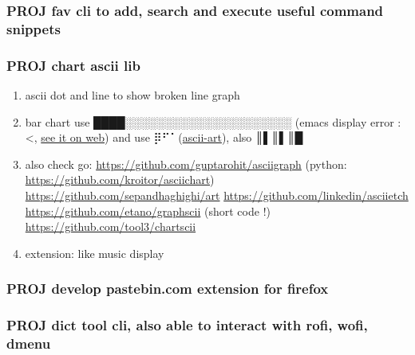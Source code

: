 \documentclass[11pt]{article}
\begin{document}
\subsubsection{{\bfseries\sffamily PROJ} fav cli to add, search and execute useful command snippets}
\label{sec:org29f35db}
\subsubsection{{\bfseries\sffamily PROJ} chart ascii lib}
\label{sec:org7ee26d0}
\begin{enumerate}
\item ascii dot and line to show broken line graph
\item bar chart use ████░░░░░░░░░░░░░░░░░░░░░ (emacs display error :<, \href{https://github.com/Ziqi-Yang}{see it on web})
and use ⡿⠋⠁(\href{https://www.twitchquotes.com/copypastas/ascii-art}{ascii-art}), also ║▌║▌║█
\item also check go: \url{https://github.com/guptarohit/asciigraph} (python: \url{https://github.com/kroitor/asciichart})
\url{https://github.com/sepandhaghighi/art} \url{https://github.com/linkedin/asciietch}
\url{https://github.com/etano/graphscii} (short code !)
\url{https://github.com/tool3/chartscii}
\item extension: like music display
\end{enumerate}

\subsubsection{{\bfseries\sffamily PROJ} develop pastebin.com extension for firefox}
\label{sec:org40cbc8a}
\subsubsection{{\bfseries\sffamily PROJ} dict tool cli, also able to interact with rofi, wofi, dmenu}
\label{sec:org920d8e6}
\end{document}
